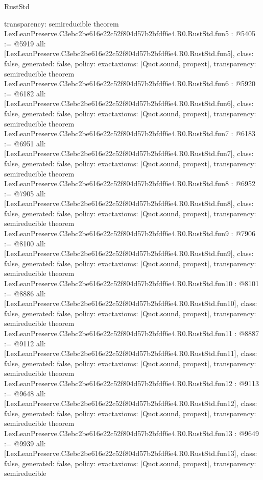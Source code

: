 \begin{lexlean}{RustStd}
\begin{coremodule}
{  transparency: semireducible
}
theorem LexLeanPreserve.C3ebc2be616e22c52f804d57b2bfdf6e4.R0.RustStd.fun5 : @5405 := @5919 {
  all: [LexLeanPreserve.C3ebc2be616e22c52f804d57b2bfdf6e4.R0.RustStd.fun5],
  class: false,
  generated: false,
  policy: exact{axioms: [Quot.sound, propext]},
  transparency: semireducible
}
theorem LexLeanPreserve.C3ebc2be616e22c52f804d57b2bfdf6e4.R0.RustStd.fun6 : @5920 := @6182 {
  all: [LexLeanPreserve.C3ebc2be616e22c52f804d57b2bfdf6e4.R0.RustStd.fun6],
  class: false,
  generated: false,
  policy: exact{axioms: [Quot.sound, propext]},
  transparency: semireducible
}
theorem LexLeanPreserve.C3ebc2be616e22c52f804d57b2bfdf6e4.R0.RustStd.fun7 : @6183 := @6951 {
  all: [LexLeanPreserve.C3ebc2be616e22c52f804d57b2bfdf6e4.R0.RustStd.fun7],
  class: false,
  generated: false,
  policy: exact{axioms: [Quot.sound, propext]},
  transparency: semireducible
}
theorem LexLeanPreserve.C3ebc2be616e22c52f804d57b2bfdf6e4.R0.RustStd.fun8 : @6952 := @7905 {
  all: [LexLeanPreserve.C3ebc2be616e22c52f804d57b2bfdf6e4.R0.RustStd.fun8],
  class: false,
  generated: false,
  policy: exact{axioms: [Quot.sound, propext]},
  transparency: semireducible
}
theorem LexLeanPreserve.C3ebc2be616e22c52f804d57b2bfdf6e4.R0.RustStd.fun9 : @7906 := @8100 {
  all: [LexLeanPreserve.C3ebc2be616e22c52f804d57b2bfdf6e4.R0.RustStd.fun9],
  class: false,
  generated: false,
  policy: exact{axioms: [Quot.sound, propext]},
  transparency: semireducible
}
theorem LexLeanPreserve.C3ebc2be616e22c52f804d57b2bfdf6e4.R0.RustStd.fun10 : @8101 := @8886 {
  all: [LexLeanPreserve.C3ebc2be616e22c52f804d57b2bfdf6e4.R0.RustStd.fun10],
  class: false,
  generated: false,
  policy: exact{axioms: [Quot.sound, propext]},
  transparency: semireducible
}
theorem LexLeanPreserve.C3ebc2be616e22c52f804d57b2bfdf6e4.R0.RustStd.fun11 : @8887 := @9112 {
  all: [LexLeanPreserve.C3ebc2be616e22c52f804d57b2bfdf6e4.R0.RustStd.fun11],
  class: false,
  generated: false,
  policy: exact{axioms: [Quot.sound, propext]},
  transparency: semireducible
}
theorem LexLeanPreserve.C3ebc2be616e22c52f804d57b2bfdf6e4.R0.RustStd.fun12 : @9113 := @9648 {
  all: [LexLeanPreserve.C3ebc2be616e22c52f804d57b2bfdf6e4.R0.RustStd.fun12],
  class: false,
  generated: false,
  policy: exact{axioms: [Quot.sound, propext]},
  transparency: semireducible
}
theorem LexLeanPreserve.C3ebc2be616e22c52f804d57b2bfdf6e4.R0.RustStd.fun13 : @9649 := @9939 {
  all: [LexLeanPreserve.C3ebc2be616e22c52f804d57b2bfdf6e4.R0.RustStd.fun13],
  class: false,
  generated: false,
  policy: exact{axioms: [Quot.sound, propext]},
  transparency: semireducible
}
\end{coremodule}
\end{lexlean}
